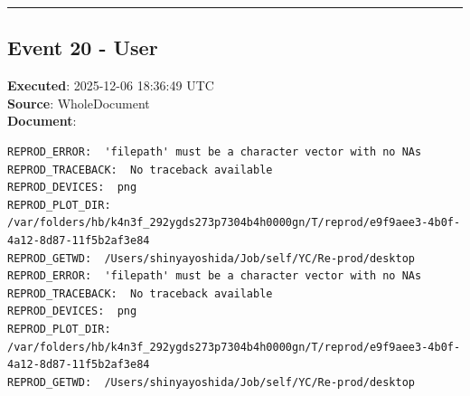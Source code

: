 \documentclass[
  11pt,
]{article}
\newenvironment{Shaded}{\begin{snugshade}}{\end{snugshade}}
\newcommand{\AttributeTok}[1]{\textcolor[rgb]{0.13,0.29,0.53}{#1}}
\newcommand{\CommentTok}[1]{\textcolor[rgb]{0.56,0.35,0.01}{\textit{#1}}}
\newcommand{\DecValTok}[1]{\textcolor[rgb]{0.00,0.00,0.81}{#1}}
\newcommand{\FunctionTok}[1]{\textcolor[rgb]{0.13,0.29,0.53}{\textbf{#1}}}
\newcommand{\NormalTok}[1]{#1}
\newcommand{\SpecialCharTok}[1]{\textcolor[rgb]{0.81,0.36,0.00}{\textbf{#1}}}
\newcommand{\StringTok}[1]{\textcolor[rgb]{0.31,0.60,0.02}{#1}}
\newenvironment{rpoutput}{\vspace{0.5em}\begin{snugshade}}{\end{snugshade}}
\begin{document}
\begin{center}\rule{0.5\linewidth}{0.5pt}\end{center}

\subsection{Event 20 - User}\label{event-20---user}

\textbf{Executed}: 2025-12-06 18:36:49 UTC\\
\textbf{Source}: WholeDocument\\
\textbf{Document}:

\begin{Shaded}
\end{Shaded}

\begin{rpoutput}

\begin{verbatim}
REPROD_ERROR:  'filepath' must be a character vector with no NAs 
REPROD_TRACEBACK:  No traceback available  
REPROD_DEVICES:  png 
REPROD_PLOT_DIR:  /var/folders/hb/k4n3f_292ygds273p7304b4h0000gn/T/reprod/e9f9aee3-4b0f-4a12-8d87-11f5b2af3e84 
REPROD_GETWD:  /Users/shinyayoshida/Job/self/YC/Re-prod/desktop 
REPROD_ERROR:  'filepath' must be a character vector with no NAs 
REPROD_TRACEBACK:  No traceback available  
REPROD_DEVICES:  png 
REPROD_PLOT_DIR:  /var/folders/hb/k4n3f_292ygds273p7304b4h0000gn/T/reprod/e9f9aee3-4b0f-4a12-8d87-11f5b2af3e84 
REPROD_GETWD:  /Users/shinyayoshida/Job/self/YC/Re-prod/desktop 
\end{verbatim}

\end{rpoutput}
\end{document}
